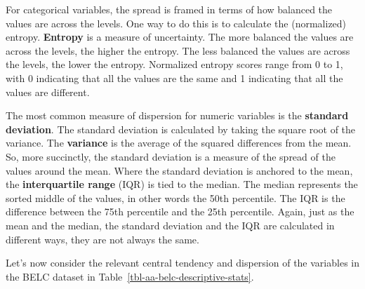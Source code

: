 \documentclass[
  letterpaper,
  DIV=11,
  numbers=noendperiod]{scrreport}
\theoremstyle{definition}
\theoremstyle{remark}
\begin{document}
For categorical variables, the spread is framed in terms of how balanced
the values are across the levels. One way to do this is to calculate the
(normalized) entropy. \textbf{Entropy} is a measure of uncertainty. The
more balanced the values are across the levels, the higher the entropy.
The less balanced the values are across the levels, the lower the
entropy. Normalized entropy scores range from 0 to 1, with 0 indicating
that all the values are the same and 1 indicating that all the values
are different.

The most common measure of dispersion for numeric variables is the
\textbf{standard deviation}. The standard deviation is calculated by
taking the square root of the variance. The \textbf{variance} is the
average of the squared differences from the mean. So, more succinctly,
the standard deviation is a measure of the spread of the values around
the mean. Where the standard deviation is anchored to the mean, the
\textbf{interquartile range} (IQR) is tied to the median. The median
represents the sorted middle of the values, in other words the 50th
percentile. The IQR is the difference between the 75th percentile and
the 25th percentile. Again, just as the mean and the median, the
standard deviation and the IQR are calculated in different ways, they
are not always the same.

Let's now consider the relevant central tendency and dispersion of the
variables in the BELC dataset in
Table~\ref{tbl-aa-belc-descriptive-stats}.
\end{document}
